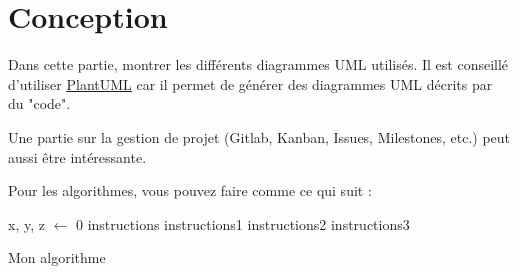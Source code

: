 \chapter{Conception}
Dans cette partie, montrer les différents diagrammes UML utilisés.
Il est conseillé d'utiliser \href{https://plantuml.com/}{PlantUML} car il permet de générer des diagrammes UML décrits par du "code".

Une partie sur la gestion de projet (Gitlab, Kanban, Issues, Milestones, etc.) peut aussi être intéressante.

Pour les algorithmes, vous pouvez faire comme ce qui suit :

\begin{algorithm}[H]
\SetAlgoLined
{}
x, y, z $\leftarrow$ 0\;
{
  instructions\;  
  {
    instructions1\;
    instructions2\;
  }
  {
   instructions3\;
  }
}
\caption{Mon algorithme}
\end{algorithm}